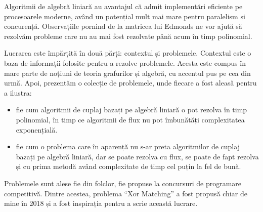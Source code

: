 Algoritmii de algebră liniară au avantajul că admit implementări eficiente pe
procesoarele moderne, având un potențial mult mai mare pentru paralelism și
concurență. Observațiile pornind de la matricea lui Edmonds ne vor ajută să rezolvăm
probleme care nu au mai fost rezolvate până acum în timp polinomial. \par

Lucrarea este împărțită în două părți: contextul și problemele. Contextul este o
baza de informații folosite pentru a rezolve problemele. Acesta este compus în
mare parte de noțiuni de teoria grafurilor și algebră, cu accentul pus pe cea din
urmă. Apoi, prezentăm o colecție de problemele, unde fiecare a fost aleasă pentru
a ilustra:
\begin{itemize}
    \item fie cum algoritmii de cuplaj bazați pe algebră liniară o pot rezolva în
    timp polinomial, în timp ce algoritmii de flux nu pot îmbunătăți complexitatea
    exponențială.
    \item fie cum o problema care în aparență nu s-ar preta algoritmilor de cuplaj
    bazați pe algebră liniară, dar se poate rezolva cu flux, se poate de fapt rezolva
    și cu prima metodă având complexitate de timp cel puțin la fel de bună.
\end{itemize}

Problemele sunt alese fie din folclor, fie propuse la concursuri de
programare competitivă. Dintre acestea, problema ``Xor Matching'' a fost propusă
chiar de mine în 2018 și a fost inspirația pentru a scrie această lucrare.
